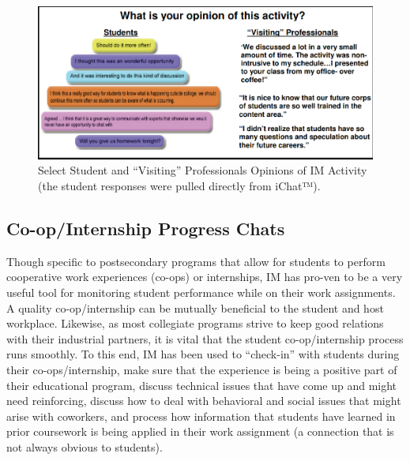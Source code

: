 \documentclass[11.5pt]{sig-alternate} %
\begin{document}
\begin{large}
\begin{figure}[!h]
    \centering
    \includegraphics[width=1\linewidth]{images/fig5.png}
    \caption{Select Student and “Visiting” Professionals Opinions of IM Activity (the student responses were pulled directly from iChat™). }
\end{figure}

\subsection*{Co-op/Internship Progress Chats }

Though specific to postsecondary programs that allow for students to perform cooperative work experiences (co-ops) or internships, IM has pro-ven to be a very useful tool for monitoring student performance while on their work assignments. A quality co-op/internship can be mutually beneficial to the student and host workplace. Likewise, as most collegiate programs strive to keep good relations with their industrial partners, it is vital that the student co-op/internship process runs smoothly. To this end, IM has been used to “check-in” with students during their co-ops/internship, make sure that the experience is being a positive part of their educational program, discuss technical issues that have come up and might need reinforcing, discuss how to deal with behavioral and social issues that might arise with coworkers, and process how information that students have learned in prior coursework is being applied in their work assignment (a connection that is not always obvious to students). 


\end{large}
\end{document}
